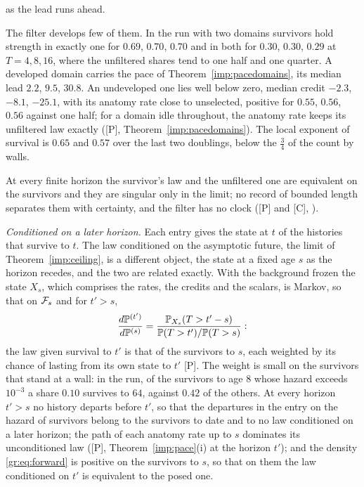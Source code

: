 \begin{description}
as the lead runs ahead.
\item[With domains.] The filter develops few of them. In the run with
two domains survivors hold strength in exactly one for $0.69$,
$0.70$, $0.70$ and in both for $0.30$, $0.30$, $0.29$ at
$T=4,8,16$, where the unfiltered shares tend to one half and one quarter.
A developed domain carries the pace of Theorem~\ref{imp:pacedomains}, its median lead
$2.2$, $9.5$, $30.8$. An undeveloped one lies well below zero,
median credit $-2.3$, $-8.1$, $-25.1$, with its anatomy rate close
to unselected, positive for $0.55$, $0.56$, $0.56$ against one
half; for a domain idle throughout, the anatomy rate keeps its unfiltered
law exactly ([P], Theorem~\ref{imp:pacedomains}). The local exponent of survival is $0.65$
and $0.57$ over the last two doublings, below the $\tfrac34$ of the
count by walls.
\item[The measure class.] At every finite horizon the survivor's law and
the unfiltered one are equivalent on the survivors and they are singular
only in the limit; no record of bounded length separates them with
certainty, and the filter has no clock ([P] and [C], \cite{GoldenSurvivorship}).
\end{description}

\emph{Conditioned on a later horizon.} Each entry gives the state at $t$
of the histories that survive to $t$. The law conditioned on the asymptotic future, the limit of Theorem~\ref{imp:ceiling}, is a different object, the
state at a fixed age $s$ as the horizon recedes, and the two are related
exactly. With the background frozen the state $X_s$, which comprises the
rates, the credits and the scalars, is Markov, so that on $\mathcal{F}_s$
and for $t'>s$,
\begin{equation}\label{gr:eq:forward}
\frac{d\mathbb{P}^{(t')}}{d\mathbb{P}^{(s)}}=\frac{\mathbb{P}_{X_s}(T>t'-s)}{\mathbb{P}(T>t')/\mathbb{P}(T>s)}:
\end{equation}
the law given survival to $t'$ is that of the survivors to $s$, each
weighted by its chance of lasting from its own state to $t'$ [P]. The
weight is small on the survivors that stand at a wall: in the run, of
the survivors to age $8$ whose hazard exceeds $10^{-3}$ a share
$0.10$ survives to $64$, against $0.42$ of the others. At
every horizon $t'>s$ no history departs before $t'$, so that the
departures in the entry on the hazard of survivors belong to the
survivors to date and to no law conditioned on a later horizon; the path
of each anatomy rate up to $s$ dominates its unconditioned law ([P],
Theorem~\ref{imp:pace}(i) at the horizon $t'$); and the density \eqref{gr:eq:forward} is positive
on the survivors to $s$, so that on them the law conditioned on $t'$ is
equivalent to the posed one.

